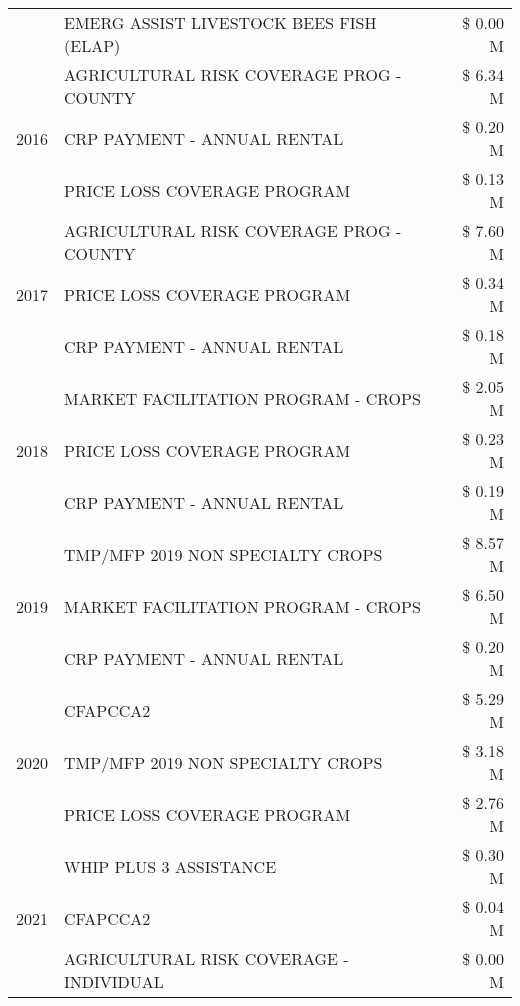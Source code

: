 \begin{tabular}{llr}
 & EMERG ASSIST LIVESTOCK BEES FISH (ELAP) & \$ 0.00 M \\
\cline{1-3}
\multirow[t]{3}{*}{2016} & AGRICULTURAL RISK COVERAGE PROG - COUNTY      & \$ 6.34 M \\
 & CRP PAYMENT - ANNUAL RENTAL                   & \$ 0.20 M \\
 & PRICE LOSS COVERAGE PROGRAM                   & \$ 0.13 M \\
\cline{1-3}
\multirow[t]{3}{*}{2017} & AGRICULTURAL RISK COVERAGE PROG - COUNTY & \$ 7.60 M \\
 & PRICE LOSS COVERAGE PROGRAM & \$ 0.34 M \\
 & CRP PAYMENT - ANNUAL RENTAL & \$ 0.18 M \\
\cline{1-3}
\multirow[t]{3}{*}{2018} & MARKET FACILITATION PROGRAM - CROPS & \$ 2.05 M \\
 & PRICE LOSS COVERAGE PROGRAM & \$ 0.23 M \\
 & CRP PAYMENT - ANNUAL RENTAL & \$ 0.19 M \\
\cline{1-3}
\multirow[t]{3}{*}{2019} & TMP/MFP 2019 NON SPECIALTY CROPS & \$ 8.57 M \\
 & MARKET FACILITATION PROGRAM - CROPS & \$ 6.50 M \\
 & CRP PAYMENT - ANNUAL RENTAL & \$ 0.20 M \\
\cline{1-3}
\multirow[t]{3}{*}{2020} & CFAPCCA2 & \$ 5.29 M \\
 & TMP/MFP 2019 NON SPECIALTY CROPS & \$ 3.18 M \\
 & PRICE LOSS COVERAGE PROGRAM & \$ 2.76 M \\
\cline{1-3}
\multirow[t]{3}{*}{2021} & WHIP PLUS 3 ASSISTANCE & \$ 0.30 M \\
 & CFAPCCA2 & \$ 0.04 M \\
 & AGRICULTURAL RISK COVERAGE - INDIVIDUAL & \$ 0.00 M \\
\cline{1-3}
\bottomrule
\end{tabular}
